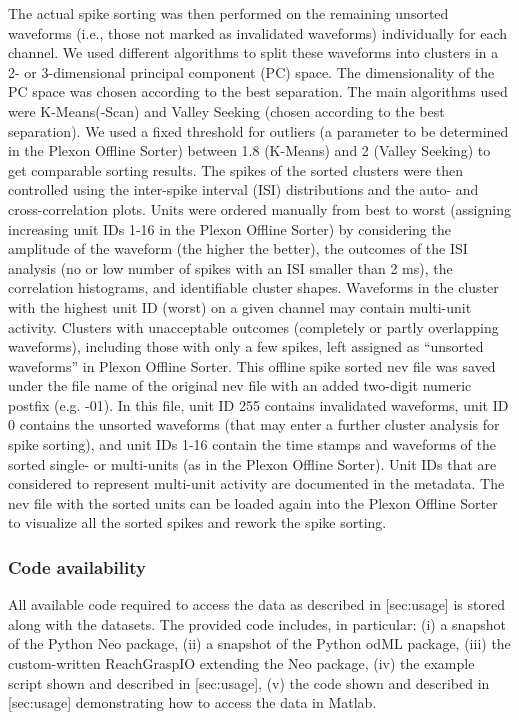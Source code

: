 The actual spike sorting was then performed on the remaining unsorted waveforms (i.e., those not marked as invalidated waveforms) individually for each channel. We used different algorithms to split these waveforms into clusters in a 2- or 3-dimensional principal component (PC) space. The dimensionality of the PC space was chosen according to the best separation. The main algorithms used were K-Means(-Scan) and Valley Seeking (chosen according to the best separation). We used a fixed threshold for outliers (a parameter to be determined in the Plexon Offline Sorter) between 1.8 (K-Means) and 2 (Valley Seeking) to get comparable sorting results. The spikes of the sorted clusters were then controlled using the inter-spike interval (ISI) distributions and the auto- and cross-correlation plots. Units were ordered manually from best to worst (assigning increasing unit IDs 1-16 in the Plexon Offline Sorter) by considering the amplitude of the waveform (the higher the better), the outcomes of the ISI analysis (no or low number of spikes with an ISI smaller than 2 ms), the correlation histograms, and identifiable cluster shapes. Waveforms in the cluster with the highest unit ID (worst) on a given channel may contain multi-unit activity. Clusters with unacceptable outcomes (completely or partly overlapping waveforms), including those with only a few spikes, left assigned as “unsorted waveforms” in Plexon Offline Sorter. This offline spike sorted nev file was saved under the file name of the original nev file with an added two-digit numeric postfix (e.g. -01). In this file, unit ID 255 contains invalidated waveforms, unit ID 0 contains the unsorted waveforms (that may enter a further cluster analysis for spike sorting), and unit IDs 1-16 contain the time stamps and waveforms of the sorted single- or multi-units (as in the Plexon Offline Sorter). Unit IDs that are considered to represent multi-unit activity are documented in the metadata. The nev file with the sorted units can be loaded again into the Plexon Offline Sorter to visualize all the sorted spikes and rework the spike sorting.

\subsubsection{Code availability}

All available code required to access the data as described in [sec:usage] is stored along with the datasets. The provided code includes, in particular: (i) a snapshot of the Python Neo package, (ii) a snapshot of the Python odML package, (iii) the custom-written ReachGraspIO extending the Neo package, (iv) the example script shown and described in [sec:usage], (v) the code shown and described in [sec:usage] demonstrating how to access the data in Matlab.

